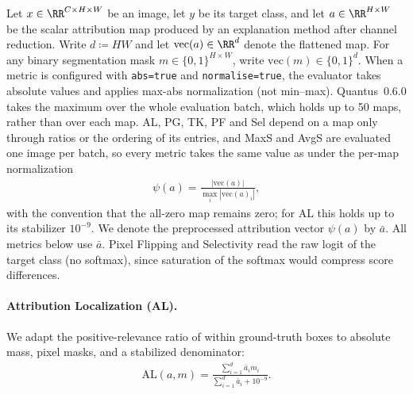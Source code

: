 Let $x \in \RR^{C \times H \times W}$ be an image, let $y$ be its target class, and let $a \in
    \RR^{H \times W}$ be the scalar attribution map produced by an explanation method after channel
reduction. Write $d \coloneqq HW$ and let $\text{vec}(a) \in \RR^d$ denote the flattened map. For
any binary segmentation mask $m \in \{0,1\}^{H \times W}$, write $\text{vec}(m) \in \{0,1\}^d$.
When a metric is configured with \texttt{abs=true} and \texttt{normalise=true}, the evaluator
takes absolute values and applies max-abs normalization (not min--max). Quantus~0.6.0 takes the
maximum over the whole evaluation batch, which holds up to 50 maps, rather than over each map.
AL, PG, TK, PF and Sel depend on a map only through ratios or the ordering of its entries, and MaxS
and AvgS are evaluated one image per batch, so every metric takes the same value as under the
per-map normalization
\begin{align}
    \psi(a) = \frac{|\text{vec}(a)|}{\max_i |\text{vec}(a)_i|},
\end{align}
with the convention that the all-zero map remains zero; for AL this holds up to its stabilizer
$10^{-9}$. We denote the preprocessed attribution vector $\psi(a)$ by $\bar{a}$. All metrics below
use $\bar{a}$. Pixel Flipping and Selectivity read the raw logit of the target class (no softmax),
since saturation of the softmax would compress score differences.

\paragraph{Attribution Localization (AL).} We adapt the positive-relevance ratio of \textcite{Kohlbrenner2020} within ground-truth boxes to absolute mass, pixel masks, and a stabilized denominator:
\begin{align}
    \text{AL}(a, m) = \frac{\sum_{i=1}^d \bar{a}_i m_i}{\sum_{i=1}^d \bar{a}_i + 10^{-9}}.
\end{align}

